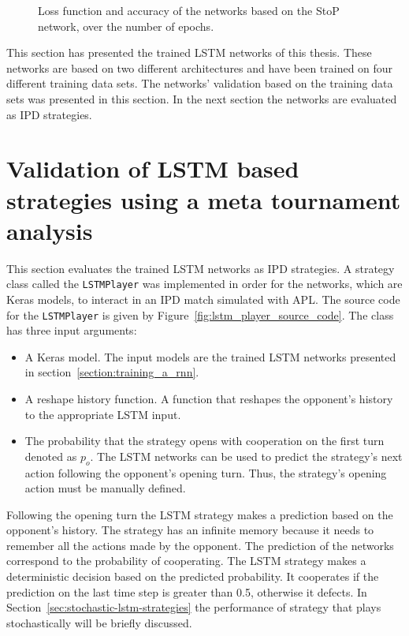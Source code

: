 \begin{figure}[!htbp]
\begin{subfigure}{\textwidth}
    \end{subfigure}
    \caption{Loss function and accuracy of the networks based on the StoP
    network, over the number of epochs.}\label{fig:validation_sequence_to_probability}
\end{figure}

This section has presented the \lstmnetworks trained LSTM networks of this thesis.
These networks are based on two different architectures and have been trained
on four different training data sets. The networks' validation based on the
training data sets was presented in this section. In the next section the networks
are evaluated as IPD strategies.

\section{Validation of LSTM based strategies using a meta tournament analysis}\label{section:rnn_strategy_validation}

This section evaluates the trained LSTM networks as IPD strategies.
A strategy class called the \texttt{LSTMPlayer} was implemented
in order for the networks, which are Keras models, to interact in an IPD match
simulated with APL. The source code for the \texttt{LSTMPlayer} is
given by Figure~\ref{fig:lstm_player_source_code}. The class has three input
arguments:

\begin{itemize}
    \item A Keras model. The input models are the \lstmnetworks trained LSTM networks
    presented in section~\ref{section:training_a_rnn}.
    \item A reshape history function. A function that reshapes the opponent's
    history to the appropriate LSTM input.
    \item The probability that the strategy opens with cooperation on the first turn denoted
    as \(p_o\). The LSTM networks can be used to predict the strategy's next
    action following the opponent's opening turn. Thus, the strategy's opening
    action must be manually defined.
\end{itemize}

Following the opening turn the LSTM strategy makes a prediction based on the
opponent's history. The strategy has an infinite memory because it needs to
remember all the actions made by the opponent. The prediction of the networks
correspond to the probability of cooperating. The LSTM strategy makes a deterministic
decision based on the predicted probability. It cooperates if the prediction
on the last time step is greater than 0.5, otherwise it defects. In Section~\ref{sec:stochastic-lstm-strategies} the performance of strategy that plays stochastically will be briefly discussed.

